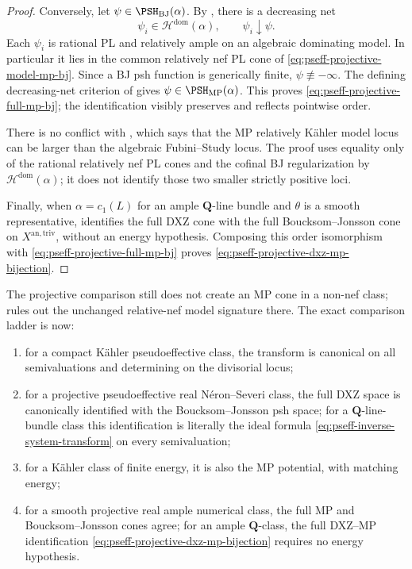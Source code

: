 \begin{proof}
Conversely, let \(\psi\in\PSH_{\mathrm{BJ}}(\alpha)\).  By
\cite[Theorem~4.15(iii)]{BJ22}, there is a decreasing net
\[
                 \psi_i\in\mathcal H^{\mathrm{dom}}(\alpha),
                 \qquad \psi_i\downarrow\psi.
\]
Each \(\psi_i\) is rational PL and relatively ample on an algebraic
dominating model.  In particular it lies in the common relatively nef PL
cone of \eqref{eq:pseff-projective-model-mp-bj}.  Since a BJ psh function
is generically finite, \(\psi\not\equiv-\infty\).  The defining
decreasing-net criterion of \cite[Definition~4.3.1]{MP24} gives
\(\psi\in\PSH_{\mathrm{MP}}(\alpha)\).  This proves
\eqref{eq:pseff-projective-full-mp-bj}; the identification visibly
preserves and reflects pointwise order.

There is no conflict with \cite[Remark~4.1.3]{MP24}, which says that the MP
relatively K\"ahler model locus can be larger than the algebraic
Fubini--Study locus.  The proof uses equality only of the rational
relatively nef PL cones and the cofinal BJ regularization by
\(\mathcal H^{\mathrm{dom}}(\alpha)\); it does not identify those two
smaller strictly positive loci.

Finally, when \(\alpha=c_1(L)\) for an ample \(\mathbf Q\)-line bundle
and \(\theta\) is a smooth representative, \cite[Theorem~3.14]{DXZ23}
identifies the full DXZ cone with the full Boucksom--Jonsson cone on
\(X^{\mathrm{an,triv}}\), without an energy hypothesis.  Composing this
order isomorphism with \eqref{eq:pseff-projective-full-mp-bj} proves
\eqref{eq:pseff-projective-dxz-mp-bijection}.
\end{proof}

The projective comparison still does not create an MP cone in a non-nef
class;  rules out the unchanged
relative-nef model signature there.  The exact comparison ladder is now:
\begin{enumerate}
\item for a compact K\"ahler pseudoeffective class, the transform is
      canonical on all semivaluations and determining on the divisorial
      locus;
\item for a projective pseudoeffective real N\'eron--Severi class, the full
      DXZ space is canonically identified with the Boucksom--Jonsson psh
      space; for a \(\mathbf Q\)-line-bundle class this identification is
      literally the ideal formula
      \eqref{eq:pseff-inverse-system-transform} on every semivaluation;
\item for a K\"ahler class of finite energy, it is also the MP potential,
      with matching energy;
\item for a smooth projective real ample numerical class, the full MP and
      Boucksom--Jonsson cones agree; for an ample \(\mathbf Q\)-class, the
      full DXZ--MP identification
      \eqref{eq:pseff-projective-dxz-mp-bijection} requires no energy
      hypothesis.
\end{enumerate}

